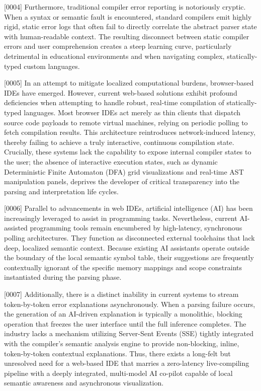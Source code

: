 \documentclass[12pt, a4paper]{article}
\begin{document}
[0004] Furthermore, traditional compiler error reporting is notoriously cryptic. When a syntax or semantic fault is encountered, standard compilers emit highly rigid, static error logs that often fail to directly correlate the abstract parser state with human-readable context. The resulting disconnect between static compiler errors and user comprehension creates a steep learning curve, particularly detrimental in educational environments and when navigating complex, statically-typed custom languages.

[0005] In an attempt to mitigate localized computational burdens, browser-based IDEs have emerged. However, current web-based solutions exhibit profound deficiencies when attempting to handle robust, real-time compilation of statically-typed languages. Most browser IDEs act merely as thin clients that dispatch source code payloads to remote virtual machines, relying on periodic polling to fetch compilation results. This architecture reintroduces network-induced latency, thereby failing to achieve a truly interactive, continuous compilation state. Crucially, these systems lack the capability to expose internal compiler states to the user; the absence of interactive execution states, such as dynamic Deterministic Finite Automaton (DFA) grid visualizations and real-time AST manipulation panels, deprives the developer of critical transparency into the parsing and interpretation life cycles.

[0006] Parallel to advancements in web IDEs, artificial intelligence (AI) has been increasingly leveraged to assist in programming tasks. Nevertheless, current AI-assisted programming tools remain encumbered by high-latency, synchronous polling architectures. They function as disconnected external toolchains that lack deep, localized semantic context. Because existing AI assistants operate outside the boundary of the local semantic symbol table, their suggestions are frequently contextually ignorant of the specific memory mappings and scope constraints instantiated during the parsing phase.

[0007] Additionally, there is a distinct inability in current systems to stream token-by-token error explanations asynchronously. When a parsing failure occurs, the generation of an AI-driven explanation is typically a monolithic, blocking operation that freezes the user interface until the full inference completes. The industry lacks a mechanism utilizing Server-Sent Events (SSE) tightly integrated with the compiler's semantic analysis engine to provide non-blocking, inline, token-by-token contextual explanations. Thus, there exists a long-felt but unresolved need for a web-based IDE that marries a zero-latency live-compiling pipeline with a deeply integrated, multi-model AI co-pilot capable of local semantic awareness and asynchronous visualization.
\end{document}
